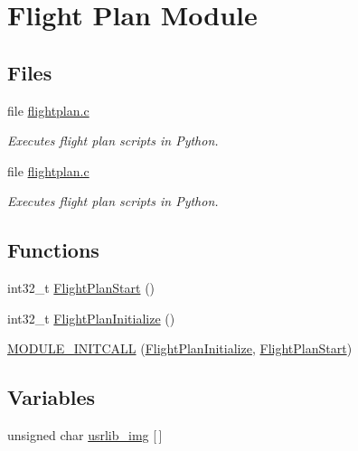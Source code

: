 \hypertarget{group___flight_plan}{\section{\-Flight \-Plan \-Module}
\label{group___flight_plan}
}
\subsection*{\-Files}
\begin{DoxyCompactItemize}
\item 
file \hyperlink{flightplan_8c}{flightplan.\-c}
\begin{DoxyCompactList}\small\item\em \-Executes flight plan scripts in \-Python. \end{DoxyCompactList}\item 
file \hyperlink{flightplan_8c}{flightplan.\-c}
\begin{DoxyCompactList}\small\item\em \-Executes flight plan scripts in \-Python. \end{DoxyCompactList}\end{DoxyCompactItemize}
\subsection*{\-Functions}
\begin{DoxyCompactItemize}
\item 
int32\-\_\-t \hyperlink{group___flight_plan_ga9e81f8d46e27e303b5f687f858968ab3}{\-Flight\-Plan\-Start} ()
\item 
int32\-\_\-t \hyperlink{group___flight_plan_gaceb66846922085678d2302b11f36d40d}{\-Flight\-Plan\-Initialize} ()
\item 
\hyperlink{group___flight_plan_ga2eb464f8541c96fded6af57aa0e7bcab}{\-M\-O\-D\-U\-L\-E\-\_\-\-I\-N\-I\-T\-C\-A\-L\-L} (\hyperlink{group___flight_plan_gaceb66846922085678d2302b11f36d40d}{\-Flight\-Plan\-Initialize}, \hyperlink{group___flight_plan_ga9e81f8d46e27e303b5f687f858968ab3}{\-Flight\-Plan\-Start})
\end{DoxyCompactItemize}
\subsection*{\-Variables}
\begin{DoxyCompactItemize}
\item 
unsigned char \hyperlink{group___flight_plan_ga1b19f06091de608524755a14f6df45d3}{usrlib\-\_\-img} \mbox{[}$\,$\mbox{]}
\end{DoxyCompactItemize}


